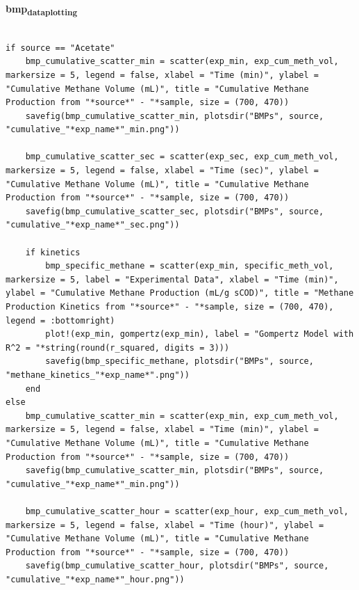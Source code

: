 \documentclass[11pt]{article}
\begin{document}
\textbf{bmp\textsubscript{data}\textsubscript{plotting}}
\begin{verbatim}

if source == "Acetate"
    bmp_cumulative_scatter_min = scatter(exp_min, exp_cum_meth_vol, markersize = 5, legend = false, xlabel = "Time (min)", ylabel = "Cumulative Methane Volume (mL)", title = "Cumulative Methane Production from "*source*" - "*sample, size = (700, 470))
    savefig(bmp_cumulative_scatter_min, plotsdir("BMPs", source, "cumulative_"*exp_name*"_min.png"))

    bmp_cumulative_scatter_sec = scatter(exp_sec, exp_cum_meth_vol, markersize = 5, legend = false, xlabel = "Time (sec)", ylabel = "Cumulative Methane Volume (mL)", title = "Cumulative Methane Production from "*source*" - "*sample, size = (700, 470))
    savefig(bmp_cumulative_scatter_sec, plotsdir("BMPs", source, "cumulative_"*exp_name*"_sec.png"))

    if kinetics
        bmp_specific_methane = scatter(exp_min, specific_meth_vol, markersize = 5, label = "Experimental Data", xlabel = "Time (min)", ylabel = "Cumulative Methane Production (mL/g sCOD)", title = "Methane Production Kinetics from "*source*" - "*sample, size = (700, 470), legend = :bottomright)
        plot!(exp_min, gompertz(exp_min), label = "Gompertz Model with R^2 = "*string(round(r_squared, digits = 3)))
        savefig(bmp_specific_methane, plotsdir("BMPs", source, "methane_kinetics_"*exp_name*".png"))
    end
else
    bmp_cumulative_scatter_min = scatter(exp_min, exp_cum_meth_vol, markersize = 5, legend = false, xlabel = "Time (min)", ylabel = "Cumulative Methane Volume (mL)", title = "Cumulative Methane Production from "*source*" - "*sample, size = (700, 470))
    savefig(bmp_cumulative_scatter_min, plotsdir("BMPs", source, "cumulative_"*exp_name*"_min.png"))

    bmp_cumulative_scatter_hour = scatter(exp_hour, exp_cum_meth_vol, markersize = 5, legend = false, xlabel = "Time (hour)", ylabel = "Cumulative Methane Volume (mL)", title = "Cumulative Methane Production from "*source*" - "*sample, size = (700, 470))
    savefig(bmp_cumulative_scatter_hour, plotsdir("BMPs", source, "cumulative_"*exp_name*"_hour.png"))


\end{verbatim}
\end{document}
